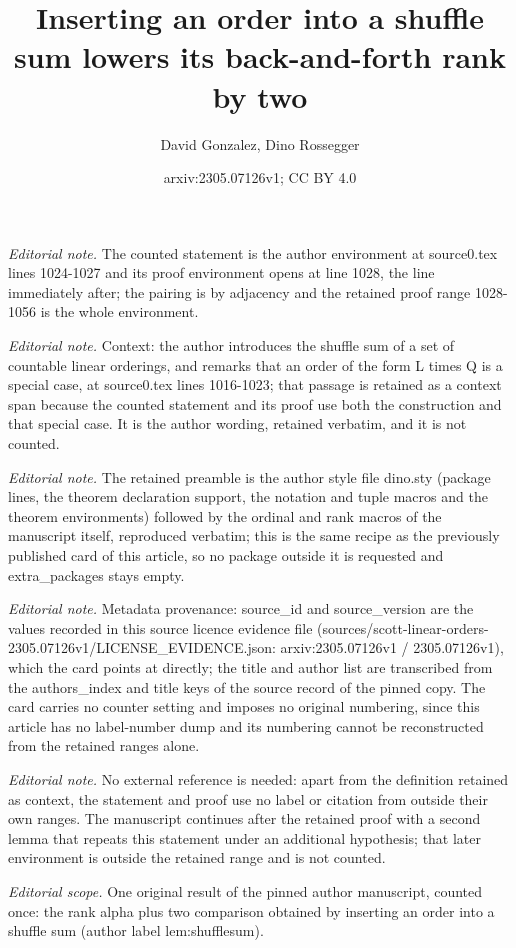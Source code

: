 \documentclass[10pt,a4paper]{amsart}
\title{Inserting an order into a shuffle sum lowers its back-and-forth rank by two}
\author{David Gonzalez, Dino Rossegger}
\date{arxiv:2305.07126v1; CC BY 4.0}
\begin{document}
\maketitle
\noindent\textit{Editorial note.} The counted statement is the author environment at source0.tex lines 1024-1027 and its proof environment opens at line 1028, the line immediately after; the pairing is by adjacency and the retained proof range 1028-1056 is the whole environment.\par\medskip
\noindent\textit{Editorial note.} Context: the author introduces the shuffle sum of a set of countable linear orderings, and remarks that an order of the form L times Q is a special case, at source0.tex lines 1016-1023; that passage is retained as a context span because the counted statement and its proof use both the construction and that special case. It is the author wording, retained verbatim, and it is not counted.\par\medskip
\noindent\textit{Editorial note.} The retained preamble is the author style file dino.sty (package lines, the theorem declaration support, the notation and tuple macros and the theorem environments) followed by the ordinal and rank macros of the manuscript itself, reproduced verbatim; this is the same recipe as the previously published card of this article, so no package outside it is requested and extra\_packages stays empty.\par\medskip
\noindent\textit{Editorial note.} Metadata provenance: source\_id and source\_version are the values recorded in this source licence evidence file (sources/scott-linear-orders-2305.07126v1/LICENSE\_EVIDENCE.json: arxiv:2305.07126v1 / 2305.07126v1), which the card points at directly; the title and author list are transcribed from the authors\_index and title keys of the source record of the pinned copy. The card carries no counter setting and imposes no original numbering, since this article has no label-number dump and its numbering cannot be reconstructed from the retained ranges alone.\par\medskip
\noindent\textit{Editorial note.} No external reference is needed: apart from the definition retained as context, the statement and proof use no label or citation from outside their own ranges. The manuscript continues after the retained proof with a second lemma that repeats this statement under an additional hypothesis; that later environment is outside the retained range and is not counted.\par\medskip
\noindent\textit{Editorial scope.} One original result of the pinned author manuscript, counted once: the rank alpha plus two comparison obtained by inserting an order into a shuffle sum (author label lem:shufflesum).\par\medskip
\end{document}
